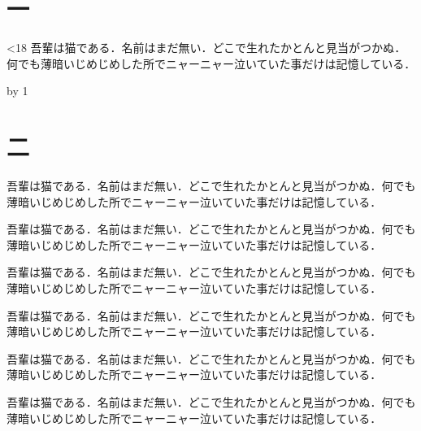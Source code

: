 \documentclass[twocolumn,paper=a4,fontsize=10pt]{jlreq}
\newcommand\para{吾輩は猫である．名前はまだ無い．どこで生れたかとんと見当がつかぬ．何でも薄暗いじめじめした所でニャーニャー泣いていた事だけは記憶している．\par}
\begin{document}
\section{一}
 \loop\ifnum\n<18 \para \advance\n by 1 \repeat
{}
\section{二}
\para\para\para\para\para\para
\end{document}
